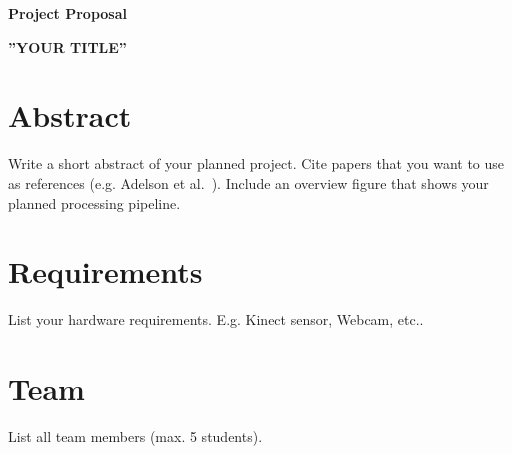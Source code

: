 \documentclass[a4paper,pagesize 10pt]{scrartcl}
\begin{document}
\begin{center}{\Huge\textbf{Project Proposal}}\end{center}
\begin{center}{\Large\textbf{''YOUR TITLE''}}\end{center}

\section{Abstract}

%
Write a short abstract of your planned project.
%
Cite papers that you want to use as references (e.g. Adelson et al.~\cite{adelson1984pyramid}).
%
Include an overview figure that shows your planned processing pipeline.
%


\section{Requirements}
List your hardware requirements. E.g. Kinect sensor, Webcam, etc..

\section{Team}
List all team members (max. 5 students).


{\small
	
	
}
\end{document}
